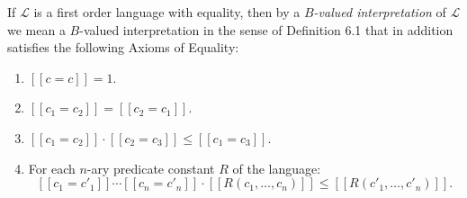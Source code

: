 If $\mathcal{L}$ is a first order language with equality, then by a \textit{$B$-valued interpretation} of $\mathcal{L}$ we mean a $B$-valued interpretation in the sense of Definition 6.1 that in addition satisfies the following Axioms of Equality:
\begin{enumerate}
\item $[\![c = c]\!] = 1$.
\item $[\![c_1 = c_2]\!] = [\![c_2 = c_1]\!]$.
\item $[\![c_1 = c_2]\!] \cdot [\![c_2 = c_3]\!] \leq [\![c_1 = c_3]\!]$.
\item For each $n$-ary predicate constant $R$ of the language:
$$[\![c_1 = c'_1]\!] \cdots [\![c_n = c'_n]\!] \cdot [\![R(c_1, \ldots, c_n)]\!] \leq [\![R(c'_1, \ldots, c'_n)]\!].$$
\end{enumerate}
